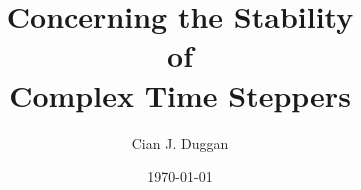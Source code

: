 \title{\bf\Huge Concerning the Stability \\ of \\ Complex Time Steppers}
\author{\Large Cian J. Duggan}
\date{\today}

\maketitle
\thispagestyle{empty}
\newpage

\tableofcontents
\thispagestyle{empty}
\newpage
\setcounter{page}{1}
